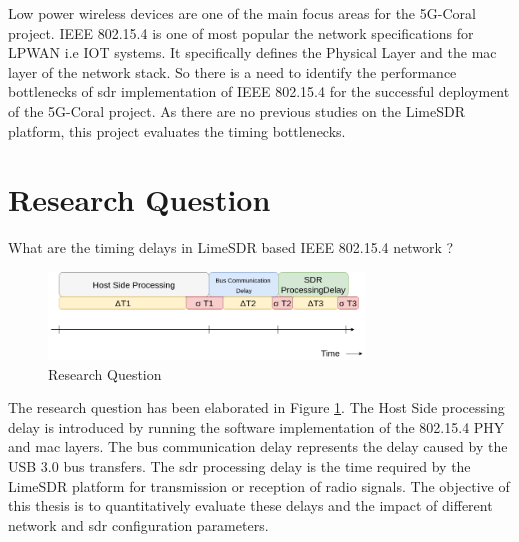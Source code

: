 Low power wireless devices are one of the main focus areas for the 5G-Coral project.
IEEE 802.15.4 is one of most popular the network specifications for \ac{LPWAN} i.e \ac{IOT} systems.
It specifically defines the Physical Layer and the \ac{mac} layer of the network stack.
So there is a need to identify the performance bottlenecks of \ac{sdr} implementation of IEEE 802.15.4 for the successful deployment of the 5G-Coral project.
As there are no previous studies on the LimeSDR platform, this project evaluates the timing bottlenecks.









\section{Research Question}
What are the timing delays in  LimeSDR based IEEE 802.15.4 network ?
\begin{figure}[!h]
\centering
\includegraphics[width=0.75\textwidth]{Figure/RQ1.png}
\caption{Research Question}
\label{rq1}
\end{figure}

The research question has been elaborated in Figure \ref{rq1}.
The Host Side processing delay is introduced by running the software implementation of the 802.15.4 \ac{PHY} and \ac{mac} layers.
The bus communication delay represents the delay caused by the \ac{USB} 3.0 bus transfers.
The \ac{sdr} processing delay is the time required by the LimeSDR platform for transmission or reception of radio signals.
The objective of this thesis is to quantitatively evaluate these delays and the impact of different network and \ac{sdr} configuration parameters.

